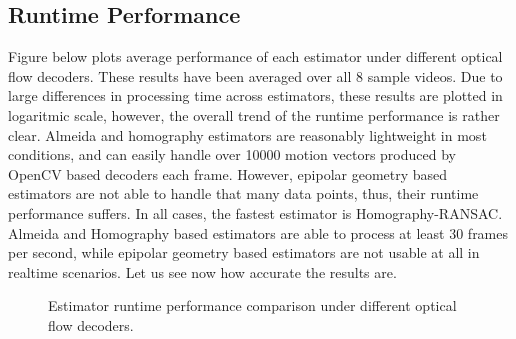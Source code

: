 \documentclass[11pt,english]{report}
\newcommand{\getstat}[1]{docs/statistics/#1}
\newcommand{\statplot}[4]{
	\addplot[#3, mark = #4, thick, smooth, mark size = 2, mark options={fill=#3}] table [y=#2, col sep=comma] {\getstat{#1}};
}
\begin{document}
\subsection{Runtime Performance}

Figure below plots average performance of each estimator under different optical flow decoders. These results have been averaged over all 8 sample videos. Due to large differences in processing time across estimators, these results are plotted in logaritmic scale, however, the overall trend of the runtime performance is rather clear. Almeida and homography estimators are reasonably lightweight in most conditions, and can easily handle over 10000 motion vectors produced by OpenCV based decoders each frame. However, epipolar geometry based estimators are not able to handle that many data points, thus, their runtime performance suffers. In all cases, the fastest estimator is Homography-RANSAC. Almeida and Homography based estimators are able to process at least 30 frames per second, while epipolar geometry based estimators are not usable at all in realtime scenarios. Let us see now how accurate the results are.

\begin{figure}[!ht]
\begin{center}
\end{center}
\caption{\centering Estimator runtime performance comparison under different optical flow decoders.}
\end{figure}
\end{document}
